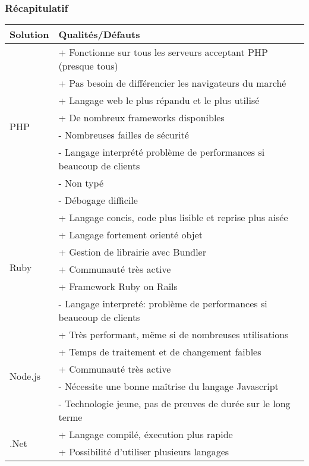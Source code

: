         \subsubsection{Récapitulatif}
        \label{recap}
        \begin{tabular}{|l|l|}
            \hline
            Solution & Qualités/Défauts \\ \hline
            \multirow{8}{*}{PHP} & + Fonctionne sur tous les serveurs acceptant PHP (presque tous) \\
                & + Pas besoin de différencier les navigateurs du marché \\
                & + Langage web le plus répandu et le plus utilisé \\
                & + De nombreux frameworks disponibles \\
                & - Nombreuses failles de sécurité \\
                & - Langage interprété problème de performances si beaucoup de clients \\
                & - Non typé \\
                & - Débogage difficile \\ \hline
            \multirow{6}{*}{Ruby} & + Langage concis, code plus lisible et reprise plus aisée \\
                & + Langage fortement orienté objet \\
                & + Gestion de librairie avec Bundler \\
                & + Communauté très active \\
                & + Framework Ruby on Rails \\
                & - Langage interpreté: problème de performances si beaucoup de clients \\ \hline
            \multirow{5}{*}{Node.js} & + Très performant, mëme si de nombreuses utilisations \\
                & + Temps de traitement et de changement faibles \\
                & + Communauté très active \\
                & - Nécessite une bonne maîtrise du langage Javascript \\
                & - Technologie jeune, pas de preuves de durée sur le long terme \\ \hline
            \multirow{6}{*}{.Net} & + Langage compilé, éxecution plus rapide \\
                & + Possibilité d'utiliser plusieurs langages \\

\end{tabular}
